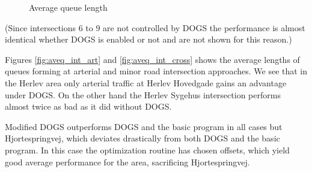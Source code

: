 \begin{figure}[htbp]
\centering
{}

\caption{Average queue length}
\end{figure}

(Since intersections 6 to 9 are not controlled by DOGS the performance is almost identical whether DOGS is enabled or not and are not shown for this reason.)

Figures \ref{fig:aveq_int_art} and \ref{fig:aveq_int_cross} shows the average lengths of queues forming at arterial and  minor road intersection approaches. We see that in the Herlev area only arterial traffic at Herlev Hovedgade gains an advantage under DOGS. On the other hand the Herlev Sygehus intersection performs almost twice as bad as it did without DOGS.

Modified DOGS outperforms DOGS and the basic program in all cases but Hjortespringvej, which deviates drastically from both DOGS and the basic program. In this case the optimization routine has chosen offsets, which yield good average performance for the area, sacrificing Hjortespringvej.

